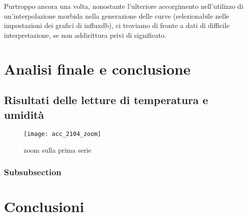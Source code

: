 \documentclass[fleqn,10pt]{SelfArx} %
\begin{document}
Purtroppo ancora una volta, nonostante l'ulteriore accorgimento nell'utilizzo di un'interpolazione morbida nella generazione delle 
curve (selezionabile nelle impostazioni dei grafici di influxdb), ci troviamo di fronte a dati di difficile interpretazione, se non 
addirittura privi di significato.

\section{Analisi finale e conclusione}

\subsection{Risultati delle letture di temperatura e umidità}





\begin{figure}[htb]\centering
	\texttt{[image: acc\_2104\_zoom]}
	\caption{zoom sulla prima serie}
	\label{fig:zoom accelerazione 2104}
\end{figure}





\subsubsection{Subsubsection}

\section{Conclusioni}





\end{document}

